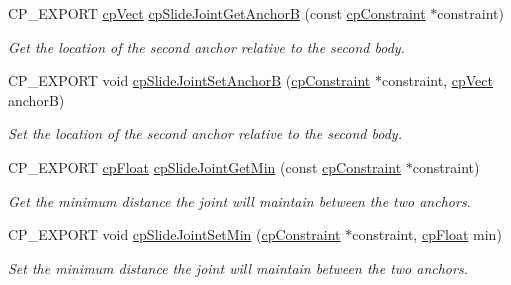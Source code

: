 \begin{DoxyCompactItemize}
\mbox{\label{group__cp_slide_joint_ga0230341fdf16923177c497f771d8eebb}} 
C\+P\+\_\+\+E\+X\+P\+O\+RT \mbox{\hyperlink{structcp_vect}{cp\+Vect}} \mbox{\hyperlink{group__cp_slide_joint_ga0230341fdf16923177c497f771d8eebb}{cp\+Slide\+Joint\+Get\+AnchorB}} (const \mbox{\hyperlink{structcp_constraint}{cp\+Constraint}} $\ast$constraint)
\begin{DoxyCompactList}\small\item\em Get the location of the second anchor relative to the second body. \end{DoxyCompactList}\item 
\mbox{\label{group__cp_slide_joint_ga511145fb4b1913aa85f7fe502e4407d1}} 
C\+P\+\_\+\+E\+X\+P\+O\+RT void \mbox{\hyperlink{group__cp_slide_joint_ga511145fb4b1913aa85f7fe502e4407d1}{cp\+Slide\+Joint\+Set\+AnchorB}} (\mbox{\hyperlink{structcp_constraint}{cp\+Constraint}} $\ast$constraint, \mbox{\hyperlink{structcp_vect}{cp\+Vect}} anchorB)
\begin{DoxyCompactList}\small\item\em Set the location of the second anchor relative to the second body. \end{DoxyCompactList}\item 
\mbox{\label{group__cp_slide_joint_gaa3e2239ae46655548ecd29d9fe6b23f9}} 
C\+P\+\_\+\+E\+X\+P\+O\+RT \mbox{\hyperlink{group__basic_types_gac1ed65573e035bf892505768c852d8d3}{cp\+Float}} \mbox{\hyperlink{group__cp_slide_joint_gaa3e2239ae46655548ecd29d9fe6b23f9}{cp\+Slide\+Joint\+Get\+Min}} (const \mbox{\hyperlink{structcp_constraint}{cp\+Constraint}} $\ast$constraint)
\begin{DoxyCompactList}\small\item\em Get the minimum distance the joint will maintain between the two anchors. \end{DoxyCompactList}\item 
\mbox{\label{group__cp_slide_joint_ga67df01ba84cfc0897884e241c8337110}} 
C\+P\+\_\+\+E\+X\+P\+O\+RT void \mbox{\hyperlink{group__cp_slide_joint_ga67df01ba84cfc0897884e241c8337110}{cp\+Slide\+Joint\+Set\+Min}} (\mbox{\hyperlink{structcp_constraint}{cp\+Constraint}} $\ast$constraint, \mbox{\hyperlink{group__basic_types_gac1ed65573e035bf892505768c852d8d3}{cp\+Float}} min)
\begin{DoxyCompactList}\small\item\em Set the minimum distance the joint will maintain between the two anchors. \end{DoxyCompactList}\item 

\end{DoxyCompactItemize}
